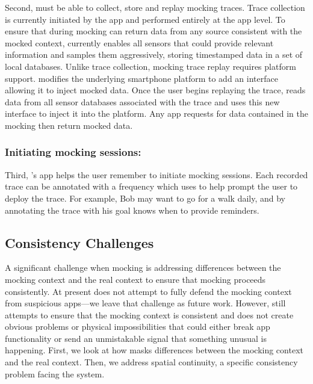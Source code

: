 Second, \PocketMocker{} must be able to collect, store and replay mocking
traces. Trace collection is currently initiated by the \PocketMocker{} app and
performed entirely at the app level. To ensure that during mocking
\PocketMocker{} can return data from any source consistent with the mocked
context, \PocketMocker{} currently enables all sensors that could provide
relevant information and samples them aggressively, storing timestamped data in
a set of local databases. Unlike trace collection, mocking trace replay
requires platform support.  \PocketMocker{} modifies the underlying smartphone
platform to add an interface allowing it to inject mocked data. Once the user
begins replaying the trace, \PocketMocker{} reads data from all sensor
databases associated with the trace and uses this new interface to inject it
into the platform.  Any app requests for data contained in the mocking then
return mocked data.

\subsubsection{Initiating mocking sessions:\space}

Third, \PocketMocker{}'s app helps the user remember to initiate mocking
sessions. Each recorded trace can be annotated with a frequency which
\PocketMocker{} uses to help prompt the user to deploy the trace. For
example, Bob may want to go for a walk daily, and by annotating the trace
with his goal \PocketMocker{} knows when to provide reminders.

\subsection{Consistency Challenges}

A significant challenge when mocking is addressing differences between the
mocking context and the real context to ensure that mocking proceeds
consistently. At present \PocketMocker{} does not attempt to fully defend the
mocking context from suspicious apps---we leave that challenge as future
work. However, \PocketMocker{} still attempts to ensure that the mocking
context is consistent and does not create obvious problems or physical
impossibilities that could either break app functionality or send an
unmistakable signal that something unusual is happening. First, we look at
how \PocketMocker{} masks differences between the mocking context and the
real context. Then, we address spatial continuity, a specific consistency
problem facing the \PocketMocker{} system.

